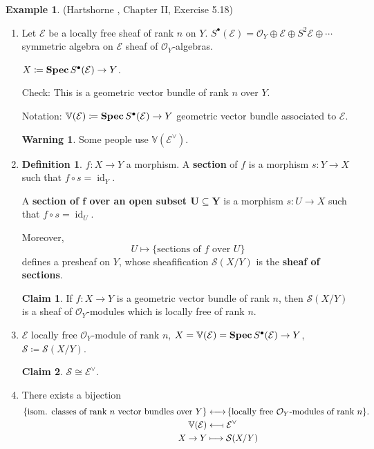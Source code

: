 \documentclass[12pt]{article}
\DeclareMathOperator{\id}{id}
\DeclareMathOperator{\relSpec}{\textnormal{\textbf{Spec}}}
\theoremstyle{definition}
\newtheorem*{definition}{Definition}
\newtheorem*{warning}{Warning}
\newtheorem*{claim}{Claim}
\newtheorem*{example}{Example}
\theoremstyle{remark}
\begin{document}
\begin{example}
(Hartshorne \cite{hartshorne2013algebraic}, Chapter II, Exercise 5.18)

\begin{enumerate}[label=\arabic*)]
\item Let $\mathcal{E}$ be a locally free sheaf of rank $n$ on $Y$. $S^{\bullet}(\mathcal{E})=\mathcal{O}_Y\oplus\mathcal{E}\oplus S^2\mathcal{E}\oplus\cdots$ symmetric algebra on $\mathcal{E}$ sheaf of $\mathcal{O}_Y$-algebras.

$X\coloneqq\relSpec S^{\bullet}(\mathcal{E})\rightarrow Y$.

Check: This is a geometric vector bundle of rank $n$ over $Y$.

Notation: $\mathbb{V}(\mathcal{E})\coloneqq\relSpec S^{\bullet}(\mathcal{E})\rightarrow Y$ geometric vector bundle associated to $\mathcal{E}$.

\begin{warning}
Some people use $\mathbb{V}(\mathcal{E}^{\vee})$.
\end{warning}

\item
\begin{definition}
$f:X\rightarrow Y$ a morphism. A \textbf{section} of $f$ is a morphism $s:Y\rightarrow X$ such that $f\circ s=\id_Y$.

A \textbf{section of $\boldsymbol{f}$ over an open subset $\boldsymbol{U\subseteq Y}$} is a morphism $s:U\rightarrow X$ such that $f\circ s=\id_U$.

Moreover,
\[U\longmapsto\{\text{sections of }f\text{ over }U\}\]
defines a presheaf on $Y$, whose sheafification $\mathcal{S}(X/Y)$ is the \textbf{sheaf of sections}.
\end{definition}

\begin{claim}
If $f:X\rightarrow Y$ is a geometric vector bundle of rank $n$, then $\mathcal{S}(X/Y)$ is a sheaf of $\mathcal{O}_Y$-modules which is locally free of rank $n$.
\end{claim}

\item $\mathcal{E}$ locally free $\mathcal{O}_Y$-module of rank $n$, $X=\mathbb{V}(\mathcal{E})=\relSpec S^{\bullet}(\mathcal{E})\rightarrow Y$, $\mathcal{S}\coloneqq\mathcal{S}(X/Y)$.

\begin{claim}
$\mathcal{S}\cong\mathcal{E}^{\vee}$.
\end{claim}

\item There exists a bijection
\begin{align*}
\{\text{isom. classes of rank }n\text{ vector bundles over }Y\}&\xleftrightarrow{\hspace{4.4mm}}\hspace{-0.5mm}\{\text{locally free }\mathcal{O}_Y\text{-modules of rank }n\}.\\
\mathbb{V}(\mathcal{E})&\longleftarrow\!\shortmid\mathcal{E}^{\vee}\\
X\rightarrow Y&\longmapsto\mathcal{S}(X/Y)
\end{align*}
\end{enumerate}
\end{example}
\end{document}
